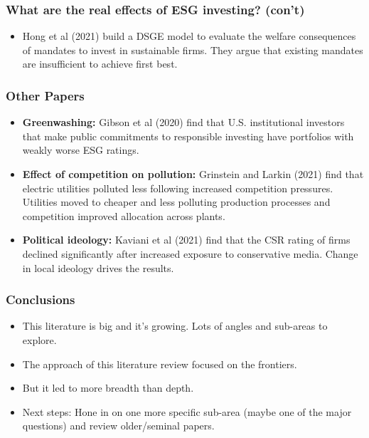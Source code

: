 \documentclass{beamer}
\begin{document}
\begin{frame}
\frametitle{What are the real effects of ESG investing? (con't)}
\begin{itemize}
\item Hong et al (2021) build a DSGE model to evaluate the welfare consequences of mandates to invest in sustainable firms. They argue that existing mandates are insufficient to achieve first best.
\end{itemize}
\end{frame}



\begin{frame}
\frametitle{Other Papers}
\begin{itemize}[<+->]
\item \textbf{Greenwashing:} Gibson et al (2020) find that U.S. institutional investors that make public commitments to responsible investing have portfolios with weakly worse ESG ratings.
\bigskip
\item \textbf{Effect of competition on pollution:} Grinstein and Larkin (2021) find that electric utilities polluted less following increased competition pressures. Utilities moved to cheaper and less polluting production processes and competition improved allocation across plants.
\bigskip
\item \textbf{Political ideology:} Kaviani et al (2021) find that the CSR rating of firms declined significantly after increased exposure to conservative media. Change in local ideology drives the results.
\end{itemize}
\end{frame}


\begin{frame}
\frametitle{Conclusions}
\begin{itemize}[<+->]
\item This literature is big and it's growing.  Lots of angles and sub-areas to explore.
\bigskip
\item The approach of this literature review focused on the frontiers.
\bigskip
\item But it led to more breadth than depth.
\bigskip
\item Next steps: Hone in on one more specific sub-area (maybe one of the major questions) and review older/seminal papers.
\end{itemize}
\end{frame}
\end{document}
